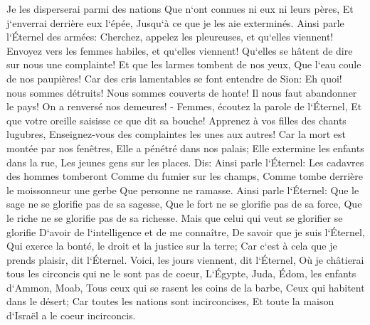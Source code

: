 \verse Je les disperserai parmi des nations Que n`ont connues ni eux ni leurs pères, Et j`enverrai derrière eux l`épée, Jusqu`à ce que je les aie exterminés. 
\verse Ainsi parle l`Éternel des armées: Cherchez, appelez les pleureuses, et qu`elles viennent! Envoyez vers les femmes habiles, et qu`elles viennent! 
\verse Qu`elles se hâtent de dire sur nous une complainte! Et que les larmes tombent de nos yeux, Que l`eau coule de nos paupières! 
\verse Car des cris lamentables se font entendre de Sion: Eh quoi! nous sommes détruits! Nous sommes couverts de honte! Il nous faut abandonner le pays! On a renversé nos demeures! - 
\verse Femmes, écoutez la parole de l`Éternel, Et que votre oreille saisisse ce que dit sa bouche! Apprenez à vos filles des chants lugubres, Enseignez-vous des complaintes les unes aux autres! 
\verse Car la mort est montée par nos fenêtres, Elle a pénétré dans nos palais; Elle extermine les enfants dans la rue, Les jeunes gens sur les places. 
\verse Dis: Ainsi parle l`Éternel: Les cadavres des hommes tomberont Comme du fumier sur les champs, Comme tombe derrière le moissonneur une gerbe Que personne ne ramasse. 
\verse Ainsi parle l`Éternel: Que le sage ne se glorifie pas de sa sagesse, Que le fort ne se glorifie pas de sa force, Que le riche ne se glorifie pas de sa richesse. 
\verse Mais que celui qui veut se glorifier se glorifie D`avoir de l`intelligence et de me connaître, De savoir que je suis l`Éternel, Qui exerce la bonté, le droit et la justice sur la terre; Car c`est à cela que je prends plaisir, dit l`Éternel. 
\verse Voici, les jours viennent, dit l`Éternel, Où je châtierai tous les circoncis qui ne le sont pas de coeur, 
\verse L`Égypte, Juda, Édom, les enfants d`Ammon, Moab, Tous ceux qui se rasent les coins de la barbe, Ceux qui habitent dans le désert; Car toutes les nations sont incirconcises, Et toute la maison d`Israël a le coeur incirconcis. 

